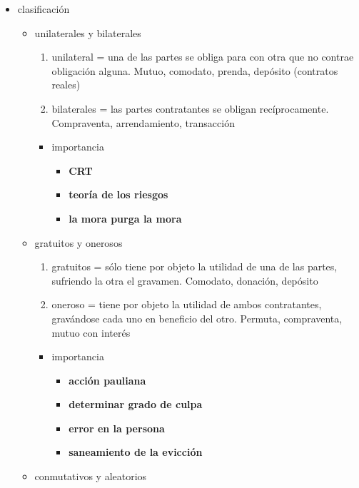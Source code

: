 \documentclass[]{article}
\providecommand{\tightlist}{%
  \setlength{\itemsep}{0pt}\setlength{\parskip}{0pt}}
\begin{document}
\begin{itemize}
\item
  clasificación

  \begin{itemize}
  \tightlist
  \item
    unilaterales y bilaterales

    \begin{enumerate}
    \def\labelenumi{\arabic{enumi}.}
    \tightlist
    \item
      unilateral = una de las partes se obliga para con otra que no
      contrae obligación alguna. Mutuo, comodato, prenda, depósito
      (contratos reales)
    \item
      bilaterales = las partes contratantes se obligan recíprocamente.
      Compraventa, arrendamiento, transacción
    \end{enumerate}

    \begin{itemize}
    \tightlist
    \item
      importancia

      \begin{itemize}
      \tightlist
      \item
        \textbf{CRT}
      \item
        \textbf{teoría de los riesgos}
      \item
        \textbf{la mora purga la mora}
      \end{itemize}
    \end{itemize}
  \item
    gratuitos y onerosos

    \begin{enumerate}
    \def\labelenumi{\arabic{enumi}.}
    \tightlist
    \item
      gratuitos = sólo tiene por objeto la utilidad de una de las
      partes, sufriendo la otra el gravamen. Comodato, donación,
      depósito
    \item
      oneroso = tiene por objeto la utilidad de ambos contratantes,
      gravándose cada uno en beneficio del otro. Permuta, compraventa,
      mutuo con interés
    \end{enumerate}

    \begin{itemize}
    \tightlist
    \item
      importancia

      \begin{itemize}
      \tightlist
      \item
        \textbf{acción pauliana}
      \item
        \textbf{determinar grado de culpa}
      \item
        \textbf{error en la persona}
      \item
        \textbf{saneamiento de la evicción}
      \end{itemize}
    \end{itemize}
  \item
    conmutativos y aleatorios


\end{itemize}
\end{itemize}
\end{document}
